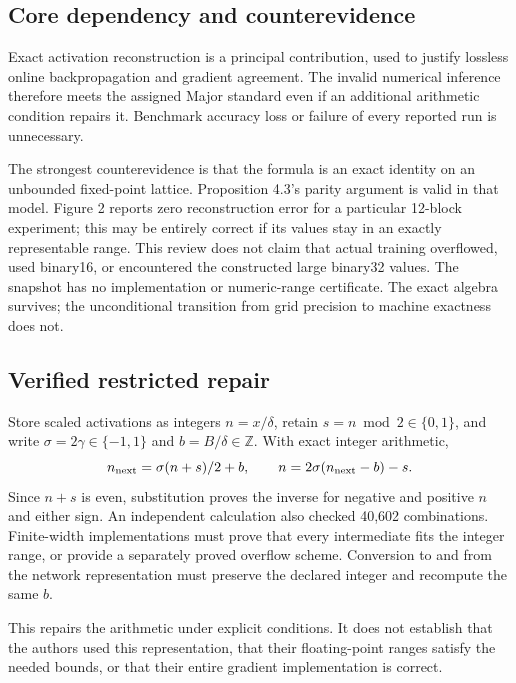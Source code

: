 \documentclass[10pt]{article}
\begin{document}
\subsection*{Core dependency and counterevidence}
Exact activation reconstruction is a principal contribution, used to justify lossless online backpropagation and gradient agreement. The invalid numerical inference therefore meets the assigned Major standard even if an additional arithmetic condition repairs it. Benchmark accuracy loss or failure of every reported run is unnecessary.\par
The strongest counterevidence is that the formula is an exact identity on an unbounded fixed-point lattice. Proposition 4.3’s parity argument is valid in that model. Figure 2 reports zero reconstruction error for a particular 12-block experiment; this may be entirely correct if its values stay in an exactly representable range. This review does not claim that actual training overflowed, used binary16, or encountered the constructed large binary32 values. The snapshot has no implementation or numeric-range certificate. The exact algebra survives; the unconditional transition from grid precision to machine exactness does not.\par
\subsection*{Verified restricted repair}
Store scaled activations as integers \(n=x/\delta\), retain \(s=n\bmod2\in\{0,1\}\), and write \(\sigma=2\gamma\in\{-1,1\}\) and \(b=B/\delta\in\mathbb Z\). With exact integer arithmetic, \[n_{\rm next}=\sigma(n+s)/2+b,\qquad
 n=2\sigma(n_{\rm next}-b)-s.\] Since \(n+s\) is even, substitution proves the inverse for negative and positive \(n\) and either sign. An independent calculation also checked 40,602 combinations. Finite-width implementations must prove that every intermediate fits the integer range, or provide a separately proved overflow scheme. Conversion to and from the network representation must preserve the declared integer and recompute the same \(b\).\par
This repairs the arithmetic under explicit conditions. It does not establish that the authors used this representation, that their floating-point ranges satisfy the needed bounds, or that their entire gradient implementation is correct.\par
\end{document}
